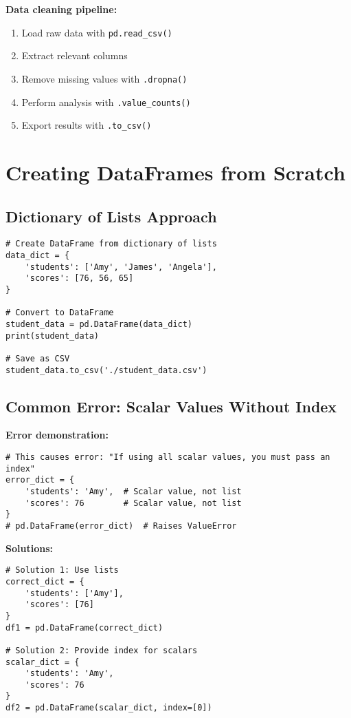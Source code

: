 \documentclass[12pt]{article}
\begin{document}
\textbf{Data cleaning pipeline:}
\begin{enumerate}
    \item Load raw data with \texttt{pd.read\_csv()}
    \item Extract relevant columns
    \item Remove missing values with \texttt{.dropna()}
    \item Perform analysis with \texttt{.value\_counts()}
    \item Export results with \texttt{.to\_csv()}
\end{enumerate}

\section{Creating DataFrames from Scratch}

\subsection{Dictionary of Lists Approach}

\begin{lstlisting}
# Create DataFrame from dictionary of lists
data_dict = {
    'students': ['Amy', 'James', 'Angela'],
    'scores': [76, 56, 65]
}

# Convert to DataFrame
student_data = pd.DataFrame(data_dict)
print(student_data)

# Save as CSV
student_data.to_csv('./student_data.csv')
\end{lstlisting}

\subsection{Common Error: Scalar Values Without Index}

\textbf{Error demonstration:}
\begin{lstlisting}
# This causes error: "If using all scalar values, you must pass an index"
error_dict = {
    'students': 'Amy',  # Scalar value, not list
    'scores': 76        # Scalar value, not list
}
# pd.DataFrame(error_dict)  # Raises ValueError
\end{lstlisting}

\textbf{Solutions:}
\begin{lstlisting}
# Solution 1: Use lists
correct_dict = {
    'students': ['Amy'],
    'scores': [76]
}
df1 = pd.DataFrame(correct_dict)

# Solution 2: Provide index for scalars
scalar_dict = {
    'students': 'Amy',
    'scores': 76
}
df2 = pd.DataFrame(scalar_dict, index=[0])
\end{lstlisting}
\end{document}
